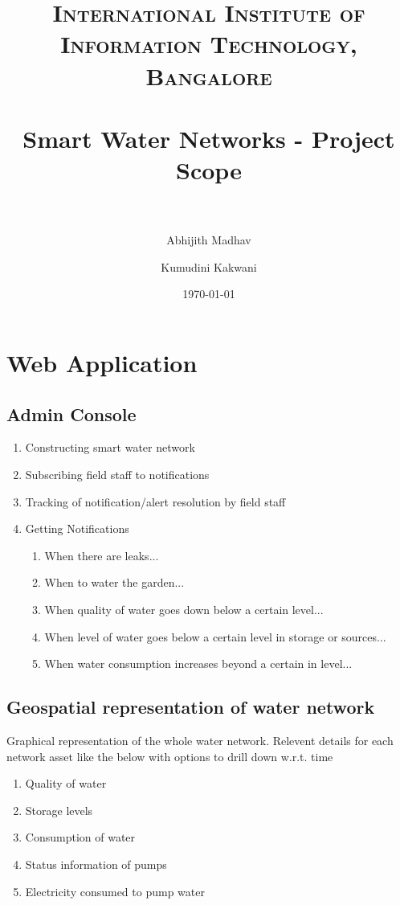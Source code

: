 \documentclass[paper=a4, fontsize=11pt]{scrartcl} %
\title{	
\normalfont \normalsize 
\textsc{International Institute of Information Technology, Bangalore} \\ [25pt] %
\horrule{0.5pt} \\[0.4cm] %
\huge Smart Water Networks - Project Scope \\ %
\horrule{2pt} \\[0.5cm] %
}
\author{Abhijith Madhav \and Kumudini Kakwani} %
\date{\normalsize\today} %
\numberwithin{equation}{section} %
\numberwithin{figure}{section} %
\numberwithin{table}{section} %
\begin{document}
\maketitle %


\section{Web Application}

\subsection{Admin Console}
\begin{enumerate}
\item
Constructing smart water network
\item
Subscribing field staff to notifications
\item
Tracking of notification/alert resolution by field staff
\item Getting Notifications
\begin{enumerate}
\item
When there are leaks...
\item
When to water the garden...
\item
When quality of water goes down below a certain level...
\item
When level of water goes below a certain level in storage or sources...
\item
When water consumption increases beyond a certain in level...
\end{enumerate}
\end{enumerate}


\subsection{Geospatial representation of water network}
Graphical representation of the whole water network. Relevent details for each network asset like the below with options to drill down w.r.t. time
\begin{enumerate}
\item
Quality of water
\item
Storage levels
\item
Consumption of water
\item
Status information of pumps
\item
Electricity consumed to pump water
\end{enumerate}
\end{document}
